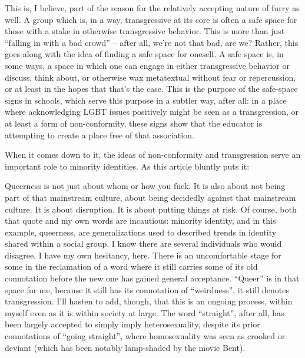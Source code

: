This is, I believe, part of the reason for the relatively accepting nature of furry as well. A group which is, in a way, transgressive at its core is often a safe space for those with a stake in otherwise transgressive behavior. This is more than just ``falling in with a bad crowd'' -- after all, we’re not that bad, are we? Rather, this goes along with the idea of finding a safe space for oneself. A safe space is, in some ways, a space in which one can engage in either transgressive behavior or discuss, think about, or otherwise wax metatextual without fear or repercussion, or at least in the hopes that that’s the case. This is the purpose of the safe-space signs in schools, which serve this purpose in a subtler way, after all: in a place where acknowledging LGBT issues positively might be seen as a transgression, or at least a form of non-conformity, these signs show that the educator is attempting to create a place free of that association.

When it comes down to it, the ideas of non-conformity and transgression serve an important role to minority identities. As this article bluntly puts it:

Queerness is not just about whom or how you fuck. It is also about not being part of that mainstream culture, about being decidedly against that mainstream culture. It is about disruption. It is about putting things at risk.
Of course, both that quote and my own words are incautious: minority identity, and in this example, queerness, are generalizations used to described trends in identity shared within a social group. I know there are several individuals who would disagree. I have my own hesitancy, here. There is an uncomfortable stage for some in the reclamation of a word where it still carries some of its old connotation before the new one has gained general acceptance. ``Queer'' is in that space for me, because it still has its connotation of ``weirdness'', it still denotes transgression. I’ll hasten to add, though, that this is an ongoing process, within myself even as it is within society at large. The word ``straight'', after all, has been largely accepted to simply imply heterosexuality, despite its prior connotations of ``going straight'', where homosexuality was seen as crooked or deviant (which has been notably lamp-shaded by the movie Bent).

